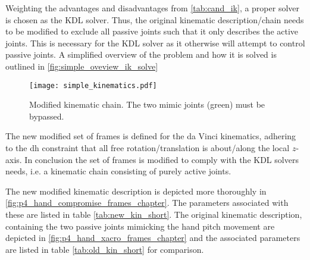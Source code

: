 Weighting the advantages and disadvantages from \autoref{tab:cand_ik}, a proper solver is chosen as the KDL solver. Thus, the original kinematic description/chain needs to be modified to exclude all passive joints such that it only describes the active joints. This is necessary for the KDL solver as it otherwise will attempt to control passive joints. A simplified overview of the problem and how it is solved is outlined in \autoref{fig:simple_oveview_ik_solve}
%
\begin{figure}[H]
\centering
	\texttt{[image: simple\_kinematics.pdf]}
	\caption{Modified kinematic chain. The two mimic joints (green) must be bypassed.}
	\label{fig:simple_oveview_ik_solve}
\end{figure}
%
The new modified set of frames is defined for the da Vinci kinematics, adhering to the \gls{dh} constraint  that all free rotation/translation is about/along the local $z$-axis. In conclusion the set of frames is modified to comply with the KDL solvers needs, i.e. a kinematic chain consisting of purely active joints.

The new modified kinematic description is depicted more thoroughly in \autoref{fig:p4_hand_compromise_frames_chapter}. The parameters associated with these are listed in table \ref{tab:new_kin_short}. The original kinematic description, containing the two passive joints mimicking the hand pitch movement are depicted in \autoref{fig:p4_hand_xacro_frames_chapter} and the associated parameters are listed in table \ref{tab:old_kin_short} for comparison.  


